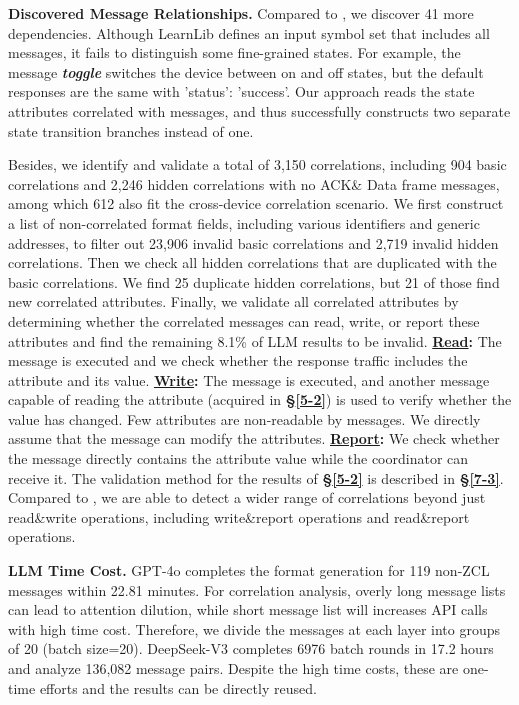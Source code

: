 \documentclass[10pt,journal,compsoc]{IEEEtran}
\begin{document}
\textbf{Discovered Message Relationships.} Compared to \textbf{{\color{Orange}{B2}}}, we discover 41 more dependencies. Although LearnLib defines an input symbol set that includes all messages, it fails to distinguish some fine-grained states. For example, the message \textbf{\textit{toggle}} switches the device between on and off states, but the default responses are the same with 'status': 'success'. Our approach reads the state attributes correlated with messages, and thus successfully constructs two separate state transition branches instead of one. 

Besides, we identify and validate a total of 3,150 correlations, including 904 basic correlations and 2,246 hidden correlations with no ACK\& Data frame messages, among which 612 also fit the cross-device correlation scenario. We first construct a list of non-correlated format fields, including various identifiers and generic addresses, to filter out 23,906 invalid basic correlations and 2,719 invalid hidden correlations. Then we check all hidden correlations that are duplicated with the basic correlations. We find 25 duplicate hidden correlations, but 21 of those find new correlated attributes. Finally, we validate all correlated attributes by determining whether the correlated messages can read, write, or report these attributes and find the remaining 8.1\% of LLM results to be invalid. \textbf{\underline{Read}:} The message is executed and we check whether the response traffic includes the attribute and its value. \textbf{\underline{Write}:} The message is executed, and another message capable of reading the attribute (acquired in \textbf{\S\ref{5-2}}) is used to verify whether the value has changed. Few attributes are non-readable by messages. We directly assume that the message can modify the attributes. \textbf{\underline{Report}:} We check whether the message directly contains the attribute value while the coordinator can receive it. The validation method for the results of \textbf{\S\ref{5-2}} is described in \textbf{\S\ref{7-3}}. Compared to \textbf{{\color{Orange}{B1}}}, we are able to detect a wider range of correlations beyond just read\&write operations, including write\&report operations and read\&report operations. \vspace{0.1cm}

\textbf{LLM Time Cost.} GPT-4o completes the format generation for 119 non-ZCL messages within 22.81 minutes. For correlation analysis, overly long message lists can lead to attention dilution, while short message list will increases API calls with high time cost. Therefore, we divide the messages at each layer into groups of 20 (batch size=20). DeepSeek-V3 completes 6976 batch rounds in 17.2 hours and analyze 136,082 message pairs. Despite the high time costs, these are one-time efforts and the results can be directly reused.
\end{document}
